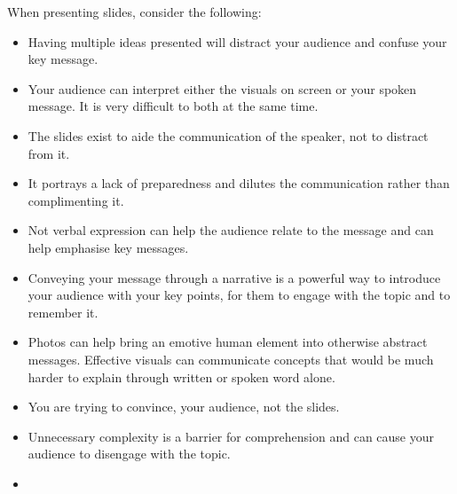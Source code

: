 \documentclass[letterpaper,10pt,english]{jupyterBook}
\begin{document}
\sphinxAtStartPar
When presenting slides, consider the following:
\begin{itemize}
\item {} 
\sphinxAtStartPar
{} Having multiple ideas presented will distract your audience and confuse your key message.

\item {} 
\sphinxAtStartPar
{} Your audience can interpret either the visuals on screen or your spoken message. It is very difficult to both at the same time.

\item {} 
\sphinxAtStartPar
{} The slides exist to aide the communication of the speaker, not to distract from it.

\item {} 
\sphinxAtStartPar
{} It portrays a lack of preparedness and dilutes the communication rather than complimenting it.

\item {} 
\sphinxAtStartPar
{} Not verbal expression can help the audience relate to the message and can help emphasise key messages.

\item {} 
\sphinxAtStartPar
{} Conveying your message through a narrative is a powerful way to introduce your audience with your key points, for them to engage with the topic and to remember it.

\item {} 
\sphinxAtStartPar
{} Photos can help bring an emotive human element into otherwise abstract messages. Effective visuals can communicate concepts that would be much harder to explain through written or spoken word alone.

\item {} 
\sphinxAtStartPar
{} You are trying to convince, your audience, not the slides.

\item {} 
\sphinxAtStartPar
{}  Unnecessary complexity is a barrier for comprehension and can cause your audience to disengage with the topic.

\item {} 
\sphinxAtStartPar
{}

\end{itemize}
\end{document}
